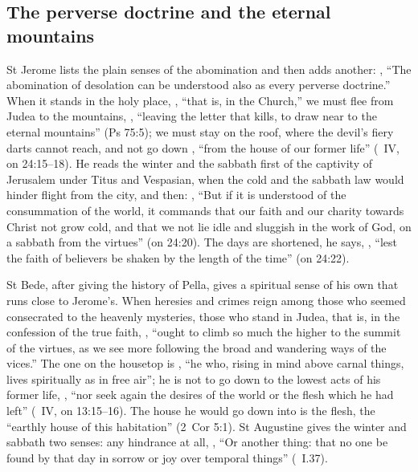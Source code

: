 \subsection{The perverse doctrine and the eternal mountains}
\label{sec:flight-jerome}

St Jerome lists the plain senses of the abomination and then adds
another: , ``The abomination of desolation can be understood also as every
perverse doctrine.'' When it stands in the holy place, , ``that is, in the Church,'' we must flee from Judea to the
mountains, , ``leaving the letter that kills, to draw near to the eternal
mountains'' (Ps 75:5); we must stay on the roof, where the devil's fiery darts
cannot reach, and not go down , ``from
the house of our former life'' (~IV, on 24:15--18). He
reads the winter and the sabbath first of the captivity of Jerusalem under
Titus and Vespasian, when the cold and the sabbath law would hinder flight
from the city, and then: , ``But if it is understood of the consummation of the world,
it commands that our faith and our charity towards Christ not grow cold, and
that we not lie idle and sluggish in the work of God, on a sabbath from the
virtues'' (on 24:20). The days are shortened, he says, , ``lest the faith of believers be shaken by the
length of the time'' (on 24:22).

St Bede, after giving the history of Pella, gives a spiritual sense of his own
that runs close to Jerome's. When heresies and crimes reign among those who
seemed consecrated to the heavenly mysteries, those who stand in Judea, that
is, in the confession of the true faith, , ``ought to climb so much the higher to the summit of the virtues, as
we see more following the broad and wandering ways of the vices.'' The one on
the housetop is , ``he who, rising in mind above carnal things, lives
spiritually as in free air''; he is not to go down to the lowest acts of his
former life, ,
``nor seek again the desires of the world or the flesh which he had left''
(~IV, on 13:15--16). The house he would go
down into is the flesh, the ``earthly house of this habitation'' (2~Cor 5:1).
St Augustine gives the winter and sabbath two senses: any hindrance at all,
, ``Or another thing: that no one be found by that day in sorrow or
joy over temporal things'' (~I.37).

